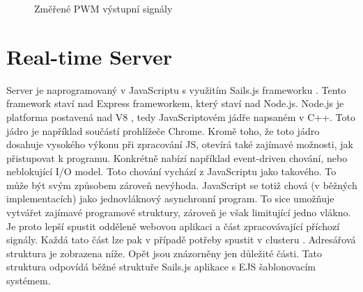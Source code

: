 \begin{figure}[H]
    \centering
	\caption{Změřené PWM výstupní signály}
	\label{fig:pwm}
\end{figure}

\section{Real-time Server}
Server je naprogramovaný v JavaScriptu s využitím Sails.js frameworku \cite{sails}. Tento framework staví nad Express frameworkem, který staví nad Node.js. Node.js je platforma postavená nad V8 \cite{v8}, tedy JavaScriptovém jádře napsaném v C++. Toto jádro je například součástí prohlížeče Chrome. Kromě toho, že toto jádro dosahuje vysokého výkonu při zpracování JS, otevírá také zajímavé možnosti, jak přistupovat k programu. Konkrétně nabízí například event-driven chování, nebo neblokující I/O model. Toto chování vychází z JavaScriptu jako takového. To může být svým způsobem zároveň nevýhoda. JavaScript se totiž chová (v běžných implementacích) jako jednovláknový asynchronní program. To sice umožňuje vytvářet zajímavé programové struktury, zároveň je však limitující jedno vlákno. Je proto lepší spustit odděleně webovou aplikaci a část zpracovávající příchozí signály. Každá tato část lze pak v případě potřeby spustit v clusteru \cite{cluster}. Adresářová struktura je zobrazena níže. Opět jsou znázorněny jen důležité části. Tato struktura odpovídá běžné struktuře Sails.js \cite{sails} aplikace s EJS šablonovacím systémem.

